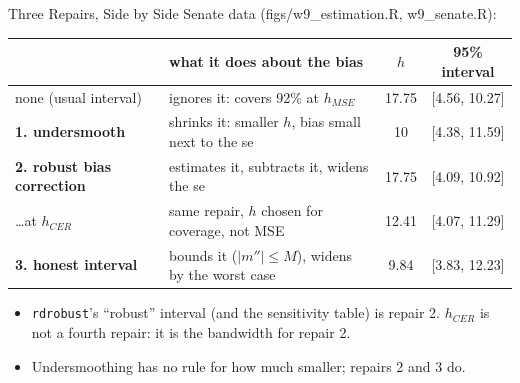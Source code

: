 \documentclass[aspectratio=169,11pt,xcolor=dvipsnames]{beamer}
\newcommand{\srcp}[1]{{\scriptsize\color{gray}(#1)}}
\newcommand{\adv}{\,\raisebox{0.6pt}{\textcolor{accent}{$\bigstar$}}}
\begin{document}
\begin{frame}{Three Repairs, Side by Side}
Senate data \srcp{figs/w9\_estimation.R, w9\_senate.R}:
\vskip0pt
\begin{center}\footnotesize
\renewcommand{\arraystretch}{1.15}
\begin{tabular}{@{}l>{\raggedright}p{5.8cm}cc@{}}
\toprule
 & what it does about the bias & $h$ & 95\% interval \\
\midrule
none (usual interval) & ignores it: covers 92\% at $h_{MSE}$ & 17.75 & [4.56, 10.27] \\
\textbf{1. undersmooth} & shrinks it: smaller $h$, bias small next to the se & 10 & [4.38, 11.59] \\
\textbf{2. robust bias correction} & estimates it, subtracts it, widens the se & 17.75 & [4.09, 10.92] \\
\quad \ldots at $h_{CER}$ & same repair, $h$ chosen for coverage, not MSE & 12.41 & [4.07, 11.29] \\
\textbf{3. honest interval}\adv & bounds it ($|m''| \leq M$), widens by the worst case & 9.84 & [3.83, 12.23] \\
\bottomrule
\end{tabular}
\end{center}
\vskip3pt
\begin{itemize}\itemsep2pt
  \item \texttt{rdrobust}'s ``robust'' interval (and the sensitivity table) is repair 2.
        $h_{CER}$ is not a fourth repair: it is the bandwidth for repair 2.
  \item Undersmoothing has no rule for how much smaller; repairs 2 and 3 do.
\end{itemize}
\end{frame}
\end{document}
